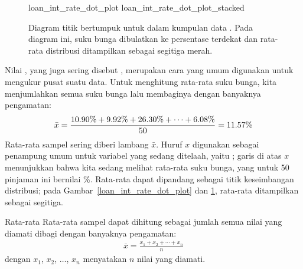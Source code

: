 \begin{figure}[h]
  \centering
    {loan_int_rate_dot_plot}
    {loan_int_rate_dot_plot_stacked}
  \caption{Diagram titik bertumpuk untuk
      dalam kumpulan data .
      Pada diagram ini, suku bunga dibulatkan ke persentase
      terdekat dan rata-rata distribusi ditampilkan sebagai
      segitiga merah.}
  \label{loan_int_rate_dot_plot_stacked}
\end{figure}

\D{\newpage}

Nilai , yang juga sering disebut
, merupakan cara yang umum
digunakan untuk mengukur pusat suatu \mbox{} data.
Untuk menghitung rata-rata suku bunga, kita menjumlahkan semua
suku bunga lalu membaginya dengan banyaknya pengamatan:
\begin{align*}
\bar{x}
    = \frac{\text{10.90\%} + \text{9.92\%} + \text{26.30\%} +
        \cdots + \text{6.08\%}}{50{}}
    = 11.57{}\%
\end{align*}
Rata-rata sampel sering diberi lambang $\bar{x}$.
Huruf $x$ digunakan sebagai penampung umum untuk variabel yang
sedang ditelaah, yaitu ; garis di atas $x$
menunjukkan bahwa kita sedang melihat rata-rata suku bunga,
yang untuk 50 pinjaman ini bernilai \loanAvg{}\%.
Rata-rata dapat dipandang sebagai titik keseimbangan distribusi;
pada Gambar~\ref{loan_int_rate_dot_plot} dan
\ref{loan_int_rate_dot_plot_stacked}, rata-rata ditampilkan
sebagai segitiga.

\begin{onebox}{Rata-rata}%
Rata-rata sampel dapat dihitung sebagai jumlah semua nilai
yang diamati dibagi dengan banyaknya pengamatan:
\begin{align*}
\bar{x} = \frac{x_1 + x_2 + \cdots + x_n}{n}
\end{align*}
dengan $x_1$, $x_2$, $\dots$, $x_n$ menyatakan
$n$ nilai yang diamati.
\end{onebox}

